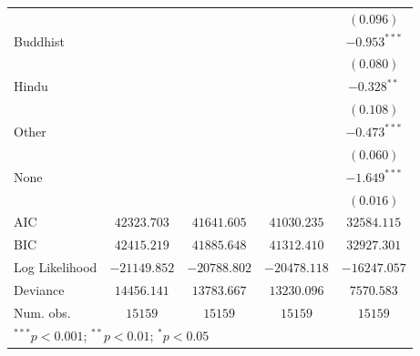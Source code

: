 \documentclass[
  12pt,
  letterpaper,
]{article}
\begin{document}
\begin{table}
\begin{center}
\begin{tabular}{l c c c c}
                                                     &                &                &                & $(0.096)$      \\
Buddhist                                             &                &                &                & $-0.953^{***}$ \\
                                                     &                &                &                & $(0.080)$      \\
Hindu                                                &                &                &                & $-0.328^{**}$  \\
                                                     &                &                &                & $(0.108)$      \\
Other                                                &                &                &                & $-0.473^{***}$ \\
                                                     &                &                &                & $(0.060)$      \\
None                                                 &                &                &                & $-1.649^{***}$ \\
                                                     &                &                &                & $(0.016)$      \\
\hline
AIC                                                  & $42323.703$    & $41641.605$    & $41030.235$    & $32584.115$    \\
BIC                                                  & $42415.219$    & $41885.648$    & $41312.410$    & $32927.301$    \\
Log Likelihood                                       & $-21149.852$   & $-20788.802$   & $-20478.118$   & $-16247.057$   \\
Deviance                                             & $14456.141$    & $13783.667$    & $13230.096$    & $7570.583$     \\
Num. obs.                                            & $15159$        & $15159$        & $15159$        & $15159$        \\
\hline
\multicolumn{5}{l}{\scriptsize{$^{***}p<0.001$; $^{**}p<0.01$; $^{*}p<0.05$}}
\end{tabular}
\label{table:coefficients}
\end{center}
\end{table}
\end{document}
